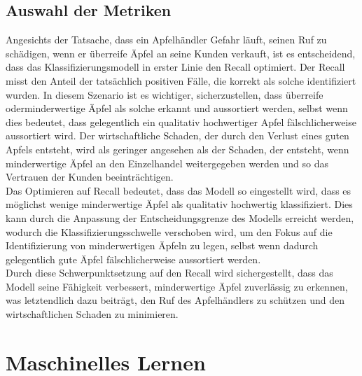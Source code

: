 \documentclass{article}
\begin{document}
\subsection{Auswahl der Metriken}
Angesichts der Tatsache, dass ein Apfelhändler Gefahr läuft, seinen Ruf zu schädigen, wenn er überreife Äpfel an seine Kunden verkauft, ist es entscheidend, dass das Klassifizierungsmodell in erster Linie den Recall optimiert. Der Recall misst den Anteil der tatsächlich positiven Fälle, die korrekt als solche identifiziert wurden. In diesem Szenario ist es wichtiger, sicherzustellen, dass überreife oderminderwertige Äpfel als solche erkannt und aussortiert werden, selbst wenn dies bedeutet, dass gelegentlich ein qualitativ hochwertiger Apfel fälschlicherweise aussortiert wird. Der wirtschaftliche Schaden, der durch den Verlust eines guten Apfels entsteht, wird als geringer angesehen als der Schaden, der entsteht, wenn minderwertige Äpfel an den Einzelhandel weitergegeben werden und so das Vertrauen der Kunden beeinträchtigen.\\
Das Optimieren auf Recall bedeutet, dass das Modell so eingestellt wird, dass es möglichst wenige minderwertige Äpfel als qualitativ hochwertig klassifiziert. Dies kann durch die Anpassung der Entscheidungsgrenze des Modells erreicht werden, wodurch die Klassifizierungsschwelle verschoben wird, um den Fokus auf die Identifizierung von minderwertigen Äpfeln zu legen, selbst wenn dadurch gelegentlich gute Äpfel fälschlicherweise aussortiert werden.\\
Durch diese Schwerpunktsetzung auf den Recall wird sichergestellt, dass das Modell seine Fähigkeit verbessert, minderwertige Äpfel zuverlässig zu erkennen, was letztendlich dazu beiträgt, den Ruf des Apfelhändlers zu schützen und den wirtschaftlichen Schaden zu minimieren.


\section{Maschinelles Lernen}
\end{document}
